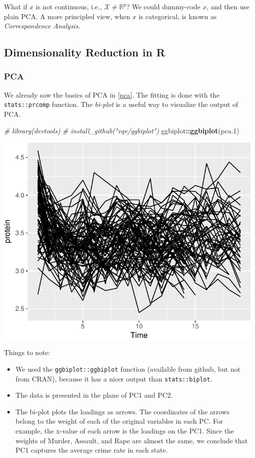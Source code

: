 \documentclass[]{book}
\newenvironment{Shaded}{\begin{snugshade}}{\end{snugshade}}
\newcommand{\CommentTok}[1]{\textcolor[rgb]{0.56,0.35,0.01}{\textit{#1}}}
\newcommand{\FloatTok}[1]{\textcolor[rgb]{0.00,0.00,0.81}{#1}}
\newcommand{\KeywordTok}[1]{\textcolor[rgb]{0.13,0.29,0.53}{\textbf{#1}}}
\newcommand{\NormalTok}[1]{#1}
\newcommand{\OperatorTok}[1]{\textcolor[rgb]{0.81,0.36,0.00}{\textbf{#1}}}
\providecommand{\tightlist}{%
  \setlength{\itemsep}{0pt}\setlength{\parskip}{0pt}}
\theoremstyle{definition}
\theoremstyle{definition}
\theoremstyle{definition}
\theoremstyle{remark}
\begin{document}
What if \(x\) is not continuous, i.e., \(\mathcal{X}\neq \mathbb{R}^p\)?
We could dummy-code \(x\), and then use plain PCA.
A more principled view, when \(x\) is categorical, is known as \emph{Correspondence Analysis}.

\hypertarget{dimensionality-reduction-in-r}{%
\subsection{Dimensionality Reduction in R}\label{dimensionality-reduction-in-r}}

\hypertarget{pca-in-r}{%
\subsubsection{PCA}\label{pca-in-r}}

We already saw the basics of PCA in \ref{pca}.
The fitting is done with the \texttt{stats::prcomp} function.
The \emph{bi-plot} is a useful way to visualize the output of PCA.

\begin{Shaded}
\begin{Highlighting}[]
\CommentTok{# library(devtools)}
\CommentTok{# install_github("vqv/ggbiplot")}
\NormalTok{ggbiplot}\OperatorTok{::}\KeywordTok{ggbiplot}\NormalTok{(pca}\FloatTok{.1}\NormalTok{) }
\end{Highlighting}
\end{Shaded}

\includegraphics[width=0.5\linewidth]{Rcourse_files/figure-latex/unnamed-chunk-240-1}

Things to note:

\begin{itemize}
\tightlist
\item
  We used the \texttt{ggbiplot::ggbiplot} function (available from github, but not from CRAN), because it has a nicer output than \texttt{stats::biplot}.
\item
  The data is presented in the plane of PC1 and PC2.
\item
  The bi-plot plots the loadings as arrows. The coordinates of the arrows belong to the weight of each of the original variables in each PC.
  For example, the x-value of each arrow is the loadings on the PC1.
  Since the weights of Murder, Assault, and Rape are almost the same, we conclude that PC1 captures the average crime rate in each state.
\end{itemize}
\end{document}
